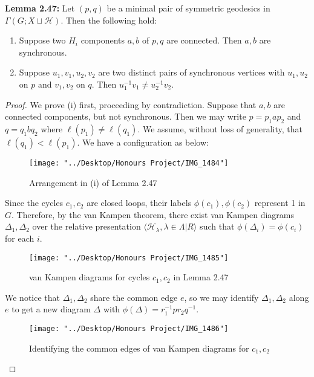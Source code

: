 \documentclass[12pt]{article}
\newcommand{\vs}{\vskip10pt}
\begin{document}
	\vs 
	
	\textbf{Lemma 2.47: } Let $(p,q)$ be a minimal pair of symmetric geodesics in $\Gamma(G; X \sqcup \mathcal{H})$. Then the following hold: 
	
	\begin{enumerate}[label = (\roman*)]
		\item Suppose two $H_i$ components $a,b$ of $p,q$ are connected. Then $a,b$ are synchronous. 
		\item Suppose $u_1, v_1, u_2, v_2$ are two distinct pairs of synchronous vertices with $u_1, u_2$ on $p$ and $v_1, v_2$ on $q$. Then $u_1^{-1}v_1 \neq u_2^{-1}v_2$.
	\end{enumerate}

	\begin{proof}
		
		We prove (i) first, proceeding by contradiction. Suppose that $a,b$ are connected components, but not synchronous. Then we may write $p = p_1 a p_2$ and $q = q_1 b q_2$ where $\ell(p_1) \neq \ell(q_1)$. We assume, without loss of generality, that $\ell(q_1) < \ell(p_1)$. We have a configuration as below: 
		
\begin{figure} [H]
	\centering
	\texttt{[image: "../Desktop/Honours Project/IMG\_1484"]}
	\caption{Arrangement in (i) of Lemma 2.47}
	\label{fig:img1484}
\end{figure}
		
		\vs
		
		Since the cycles $c_1, c_2$ are closed loops, their labels $\phi(c_1), \phi(c_2)$ represent 1 in $G$. Therefore, by the van Kampen theorem, there exist van Kampen diagrams $\Delta_1, \Delta_2$ over the relative presentation $\langle \mathcal{H}_{\lambda}, \lambda \in \Lambda \vert R \rangle$ such that $\phi(\Delta_i) = \phi(c_i)$ for each $i$. 
		
		\vs 
		
\begin{figure} [H]
	\centering
	\texttt{[image: "../Desktop/Honours Project/IMG\_1485"]}
	\caption{van Kampen diagrams for cycles $c_1, c_2$ in Lemma 2.47}
	\label{fig:img1485}
\end{figure}
		
		We notice that $\Delta_1, \Delta_2$ share the common edge $e$, so we may identify $\Delta_1, \Delta_2$ along $e$ to get a new diagram $\Delta$ with $\phi(\Delta) = r_1^{-1} p r_2 q^{-1}$. 
		
\begin{figure} [H]
	\centering
	\texttt{[image: "../Desktop/Honours Project/IMG\_1486"]}
	\caption{Identifying the common edges of van Kampen diagrams for $c_1, c_2$}
	\label{fig:img1486}
\end{figure}
		

\end{proof}
\end{document}
